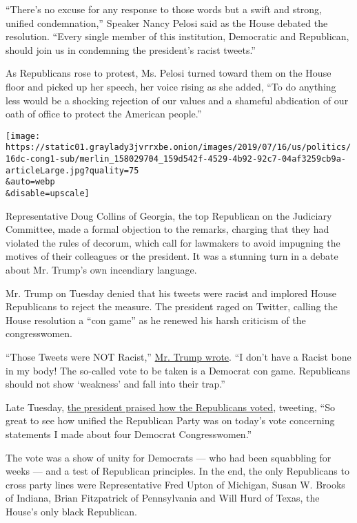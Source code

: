 ``There's no excuse for any response to those words but a swift and
strong, unified condemnation,'' Speaker Nancy Pelosi said as the House
debated the resolution. ``Every single member of this institution,
Democratic and Republican, should join us in condemning the president's
racist tweets.''

As Republicans rose to protest, Ms. Pelosi turned toward them on the
House floor and picked up her speech, her voice rising as she added,
``To do anything less would be a shocking rejection of our values and a
shameful abdication of our oath of office to protect the American
people.''

\texttt{[image: https://static01.graylady3jvrrxbe.onion/images/2019/07/16/us/politics/16dc-cong1-sub/merlin\_158029704\_159d542f-4529-4b92-92c7-04af3259cb9a-articleLarge.jpg?quality=75\\\&auto=webp\\\&disable=upscale]}

Representative Doug Collins of Georgia, the top Republican on the
Judiciary Committee, made a formal objection to the remarks, charging
that they had violated the rules of decorum, which call for lawmakers to
avoid impugning the motives of their colleagues or the president. It was
a stunning turn in a debate about Mr. Trump's own incendiary language.

Mr. Trump on Tuesday denied that his tweets were racist and implored
House Republicans to reject the measure. The president raged on Twitter,
calling the House resolution a ``con game'' as he renewed his harsh
criticism of the congresswomen.

``Those Tweets were NOT Racist,''
\href{https://twitter.com/realDonaldTrump/status/1151129281134768128}{Mr.
Trump wrote}. ``I don't have a Racist bone in my body! The so-called
vote to be taken is a Democrat con game. Republicans should not show
`weakness' and fall into their trap.''

Late Tuesday,
\href{https://twitter.com/realDonaldTrump/status/1151327083110510594}{the
president praised how the Republicans voted}, tweeting, ``So great to
see how unified the Republican Party was on today's vote concerning
statements I made about four Democrat Congresswomen.''

The vote was a show of unity for Democrats --- who had been squabbling
for weeks --- and a test of Republican principles. In the end, the only
Republicans to cross party lines were Representative Fred Upton of
Michigan, Susan W. Brooks of Indiana, Brian Fitzpatrick of Pennsylvania
and Will Hurd of Texas, the House's only black Republican.

